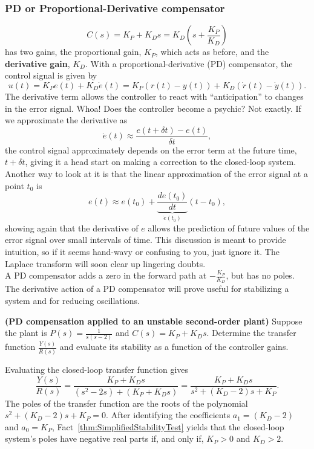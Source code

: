 \subsubsection{PD or Proportional-Derivative compensator}
\begin{equation}
\label{eq:PDcompensator}
   C(s) = K_P + K_D s = K_D \left(s + \frac{K_P}{K_D}\right) 
\end{equation}
has two gains, the proportional gain, $K_P$, which acts as before, and the \textbf{derivative gain}, $K_D$.  With a proportional-derivative (PD) compensator, the control signal is given by
$$ u(t) = K_P e(t) + K_D \dot{e}(t) = K_P(r(t) - y(t)) + K_D( \dot{r}(t) -  \dot{y}(t)).$$
The derivative term allows the controller to react with ``anticipation'' to changes in the error signal. Whoa! Does the controller become a psychic? Not exactly. If we approximate the derivative as
$$ \dot{e}(t) \approx \frac{e(t+ \delta t) - e(t)}{\delta t},$$
the control signal approximately depends on the error term at the future time, $t+ \delta t$, giving it a head start on making a correction to the closed-loop system. Another way to look at it is that the linear approximation of the error signal at a point $t_0$ is
$$ e(t) \approx e(t_0) + \underbrace{\frac{de(t_0)}{dt}}_{\dot{e}(t_0)}(t-t_0),$$
showing again that the derivative of $e$ allows the prediction of future values of the error signal over small intervals of time. This discussion is meant to provide intuition, so if it seems hand-wavy or confusing to you, just ignore it. The Laplace transform will soon clear up lingering doubts.\\

A PD compensator adds a zero in the forward path at $-\frac{K_P}{K_D}$, but has no poles. The derivative action of a PD compensator will prove useful for stabilizing a system and for reducing oscillations.\\

\begin{example} {\bf (PD compensation applied to an unstable second-order plant)}
Suppose the plant is $P(s)=\frac{1}{s(s-2)}$ and $C(s) = K_P + K_Ds$. Determine the transfer function $\frac{Y(s)}{R(s)}$ and evaluate its stability as a function of the controller gains.
\end{example}

\solution
Evaluating the closed-loop transfer function gives
    $$ \frac{Y(s)}{R(s)} = \frac{K_P + K_Ds}{(s^2 -2s) + (K_P + K_D s)} =  \frac{K_P + K_Ds}{s^2 + (K_D-2)s + K_P}.$$
    The poles of the transfer function are the roots of the polynomial $s^2 + (K_D-2)s + K_P=0$. After identifying the coefficients $a_1 = (K_D-2)$ and $a_0= K_P$, Fact~\ref{thm:SimplifiedStabilityTest} yields that the closed-loop system's poles have negative real parts if, and only if, $K_P>0$ and $K_D > 2$.    
\Qed

